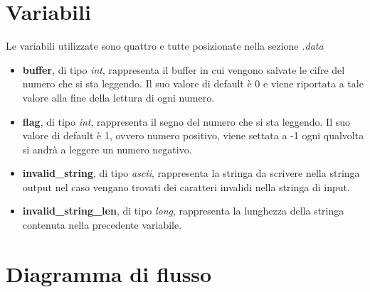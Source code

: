 \documentclass[a4paper,11pt,oneside]{book}
\begin{document}
\section{Variabili}
Le variabili utilizzate sono quattro e tutte posizionate nella sezione \emph{.data}

\begin{itemize}
  \item \textbf{buffer}, di tipo \emph{int}, rappresenta il buffer in cui vengono salvate le cifre del numero che si sta leggendo. Il suo valore di default è 0 e viene riportata a tale 
  valore alla fine della lettura di ogni numero.

  \item \textbf{flag}, di tipo \emph{int}, rappresenta il segno del numero che si sta leggendo. Il suo valore di default è 1, ovvero numero positivo, viene settata a -1 ogni qualvolta si andrà
  a leggere un numero negativo.

  \item \textbf{invalid\_string}, di tipo \emph{ascii}, rappresenta la stringa da scrivere nella stringa output nel caso vengano trovati dei caratteri invalidi nella stringa di input.
  
  \item \textbf{invalid\_string\_len}, di tipo \emph{long}, rappresenta la lunghezza della stringa contenuta nella precedente variabile.
\end{itemize}

\section{Diagramma di flusso}
\end{document}
